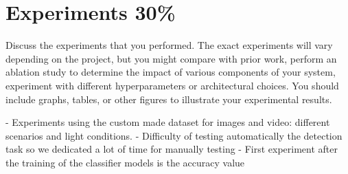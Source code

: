 \section{Experiments 30\%}
Discuss the experiments that you performed. The exact experiments will vary depending on the project, but you might compare with prior work, perform an ablation study to determine the impact of various components of your system, experiment with different hyperparameters or architectural choices. You should include graphs, tables, or other figures to illustrate your experimental results.

- Experiments using the custom made dataset for images and video: different scenarios and light conditions.
- Difficulty of testing automatically the detection task so we dedicated a lot of time for manually testing 
- First experiment after the training of the classifier models is the accuracy value
